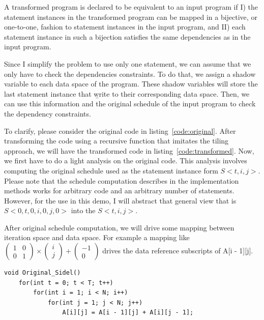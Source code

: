 \documentclass[letterpaper,12pt]{article}
\begin{document}
 A transformed program is declared to be equivalent to an input	program if I) the statement instances in the transformed program can be mapped in a bijective, or one-to-one, fashion to statement instances in the input program, and II) each statement instance in such a bijection satisfies the same dependencies as in the input program. 

Since I simplify the problem to use only one statement, we can assume that we only have to check the dependencies constraints. To do that, we assign a shadow variable to each data space of the program. These shadow variables will store the last statement instance that \b{write} to their corresponding data space. Then, we can use this information and the original schedule of the input program to check the dependency constraints.

To clarify, please consider the original code in listing~\ref{code:original}. After transforming the code using a recursive function that imitates the tiling approach, we will have the transformed code in listing~\ref{code:transformed}. Now, we first have to do a light analysis on the original code. This analysis involves computing the original schedule used as the statement instance form $S<t,i,j>$. Please note that the schedule computation describes in the implementation methods works for arbitrary code and an arbitrary number of statements. However, for the use in this demo, I will abstract that general view that is $S<0,t,0,i,0,j,0>$ into the $S<t,i,j>$. 

After original schedule computation, we will drive some mapping between iteration space and data space. For example a mapping like $\left( \begin{smallmatrix} 1&0\\ 0&1 \end{smallmatrix} \right) \times  \left( \begin{smallmatrix} i\\ j \end{smallmatrix} \right) + \left( \begin{smallmatrix} -1\\ 0 \end{smallmatrix} \right)$ drives the data reference subscripts of A[i - 1][j].
    \newpage

    \begin{lstlisting}[caption={The original code}, label={code:original}, captionpos=b]
void Original_Sidel()
	for(int t = 0; t < T; t++)
		for(int i = 1; i < N; i++)
			for(int j = 1; j < N; j++)
				A[i][j] = A[i - 1][j] + A[i][j - 1];
    \end{lstlisting}
    
\end{document}
